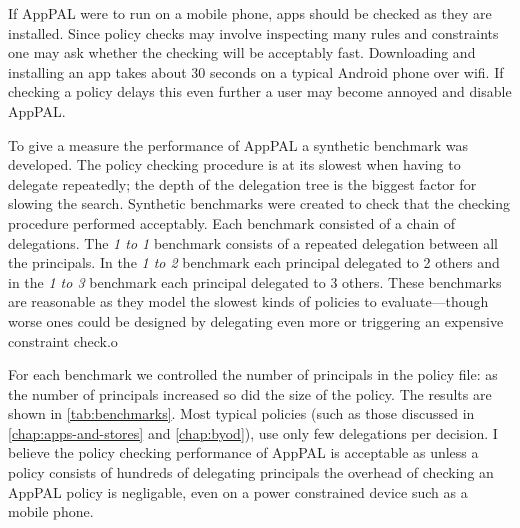 \documentclass[thesis.tex]{subfiles}
\begin{document}
If AppPAL were to run on a mobile phone, apps should be checked as they are installed.
Since policy checks may involve inspecting many rules and constraints one may ask whether the checking will be acceptably fast.
Downloading and installing an app takes about 30 seconds on a typical Android phone over wifi.
If checking a policy delays this even further a user may become annoyed and disable AppPAL.

To give a measure the performance of AppPAL a synthetic benchmark was developed.
The policy checking procedure is at its slowest when having to delegate repeatedly;
the depth of the delegation tree is the biggest factor for slowing the search.
Synthetic benchmarks were created to check that the checking procedure performed acceptably.
Each benchmark consisted of a chain of delegations.
The \emph{1 to 1} benchmark consists of a repeated delegation between all the principals.
In the \emph{1 to 2} benchmark each principal delegated to 2 others and in the \emph{1 to 3} benchmark each principal delegated to 3 others.
These benchmarks are reasonable as they model the slowest kinds of policies to
evaluate---though worse ones could be designed by delegating even more or triggering an expensive constraint check.o

For each benchmark we controlled the number of principals in the policy file:
as the number of principals increased so did the size of the policy.
The results are shown in \autoref{tab:benchmarks}.
Most typical policies (such as those discussed in \autoref{chap:apps-and-stores} and \autoref{chap:byod}), use only few delegations per decision.
I believe the policy checking performance of AppPAL is acceptable as unless a policy consists of hundreds of delegating principals the overhead of checking an AppPAL policy is negligable, even on a power constrained device such as a mobile phone.
\end{document}
